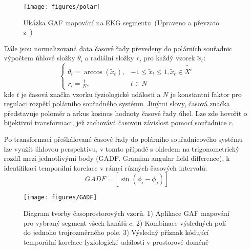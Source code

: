 \begin{figure}[h]
    \begin{center}
        \texttt{[image: figures/polar]}
        \caption{Ukázka \gls{GAF} mapování na EKG segmentu~(Upraveno a převzato z~\cite{Zhou2021})}
        \label{fig:polar}
    \end{center}
\end{figure}

Dále jsou normalizovaná data časové řady převedeny do polárních souřadnic
výpočtem úhlové složky $\theta_i$ a radiální složky $r_i$ pro každý vzorek
$\tilde{x}_t$:
\begin{equation}
    \begin{cases}
        \theta_i = \arccos(\tilde{x}_t), & -1 \leq \tilde{x}_t \leq 1, \tilde{x}_t \in \tilde{X^i} \\
        r_i = \frac{t}{N},               & t \in N
    \end{cases}
\end{equation}
kde $t$ je časová značka vzorku fyziologické události a $N$ je konstantní faktor
pro regulaci rozpětí polárního souřadného systému. Jinými slovy, časová značka
představuje poloměr a arkus kosinus hodnoty časové řady úhel. Lze zde hovořit o
bijektivní transformaci, jež zachovává časovou závislost pomocí souřadnice $r$.

Po transformaci přeškálované časové řady do polárního souřadnicového systému lze
využít úhlovou perspektivu, v tomto případě s ohledem na trigonometrický rozdíl
mezi jednotlivými body (\gls{GADF}, Gramian angular field difference), k
identifikaci temporální korelace v rámci různých časových intervalů:
\begin{equation}
    GADF = \left[\sin \left(\phi_i-\phi_j\right)\right]
\end{equation}

\begin{figure}[h]
    \begin{center}
        \texttt{[image: figures/GADF]}
        \caption{Diagram tvorby časoprostorových vzorů. 1) Aplikace GAF mapování
            pro vybraný segment všech kanálů $c$. 2) Kombinace výsledných polí
            do jednoho trojrozměrného pole. 3) Výsledný příznak kódující
            temporální korelace fyziologické události v prostorové doméně}
        \label{fig:gadf}
    \end{center}
\end{figure}


